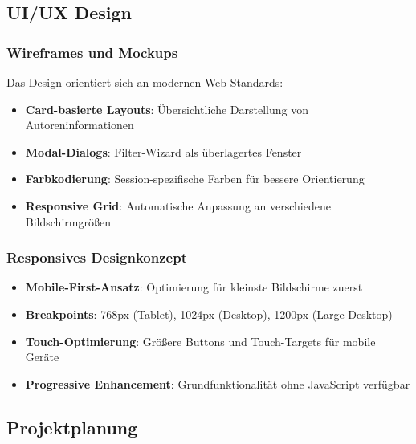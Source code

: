 \documentclass[11pt,a4paper]{article}
\begin{document}
\subsection{UI/UX Design}

\subsubsection{Wireframes und Mockups}
Das Design orientiert sich an modernen Web-Standards:
\begin{itemize}
    \item \textbf{Card-basierte Layouts}: Übersichtliche Darstellung von Autoreninformationen
    \item \textbf{Modal-Dialogs}: Filter-Wizard als überlagertes Fenster
    \item \textbf{Farbkodierung}: Session-spezifische Farben für bessere Orientierung
    \item \textbf{Responsive Grid}: Automatische Anpassung an verschiedene Bildschirmgrößen
\end{itemize}

\subsubsection{Responsives Designkonzept}
\begin{itemize}
    \item \textbf{Mobile-First-Ansatz}: Optimierung für kleinste Bildschirme zuerst
    \item \textbf{Breakpoints}: 768px (Tablet), 1024px (Desktop), 1200px (Large Desktop)
    \item \textbf{Touch-Optimierung}: Größere Buttons und Touch-Targets für mobile Geräte
    \item \textbf{Progressive Enhancement}: Grundfunktionalität ohne JavaScript verfügbar
\end{itemize}

\subsection{Projektplanung}
\end{document}
